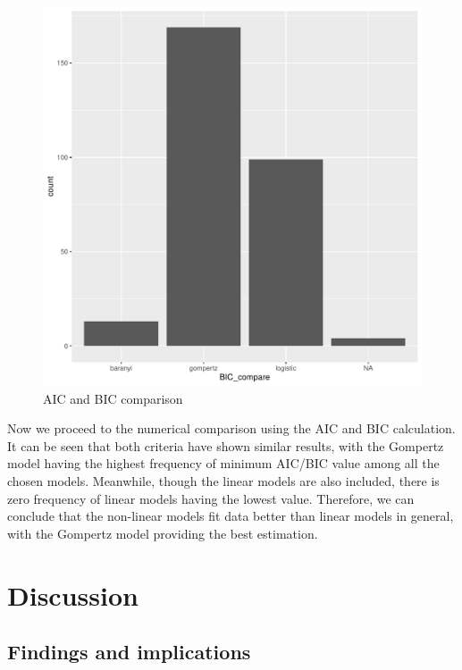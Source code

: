 \documentclass[11pt, oneside]{article}
\begin{document}
\begin{figure}[H]
\begin{center}
\begin{minipage}{.5\textwidth}
				\includegraphics[scale = 0.4]{BIC_plot.pdf}
			\end{minipage}
			\end{center}
		\caption{AIC and BIC comparison}
		\end{figure}
		
		\noindent Now we proceed to the numerical comparison using the AIC and BIC calculation. It can be seen that both criteria have shown similar results, with the Gompertz model having the highest frequency of minimum AIC/BIC value among all the chosen models. Meanwhile, though the linear models are also included,  there is zero frequency of linear models having the lowest value. Therefore, we can conclude that the non-linear models fit data better than linear models in general, with the Gompertz model providing the best estimation.

	\pagebreak
	\section{Discussion}
	
	\subsection{Findings and implications}
	
\end{document}
